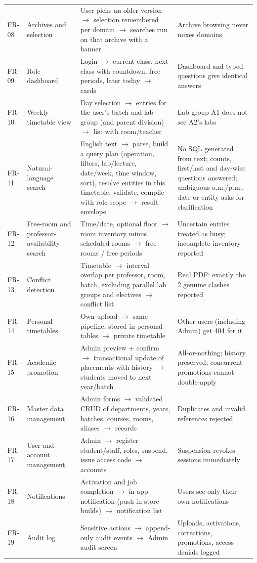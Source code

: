 \begin{longtable}{@{}p{1.1cm}p{3.4cm}p{6.2cm}p{4.9cm}@{}}
FR-08 & Archives and selection & User picks an older version $\rightarrow$ selection remembered per domain $\rightarrow$ searches run on that archive with a banner & Archive browsing never mixes domains\\
FR-09 & Role dashboard & Login $\rightarrow$ current class, next class with countdown, free periods, later today $\rightarrow$ cards & Dashboard and typed questions give identical answers\\
FR-10 & Weekly timetable view & Day selection $\rightarrow$ entries for the user's batch and lab group (and parent division) $\rightarrow$ list with room/teacher & Lab group A1 does not see A2's labs\\
FR-11 & Natural-language search & English text $\rightarrow$ parse, build a query plan (operation, filters, lab/lecture, date/week, time window, sort), resolve entities in this timetable, validate, compile with role scope $\rightarrow$ result envelope & No SQL generated from text; counts, first/last and day-wise questions answered; ambiguous a.m./p.m., date or entity asks for clarification\\
FR-12 & Free-room and professor-availability search & Time/date, optional floor $\rightarrow$ room inventory minus scheduled rooms $\rightarrow$ free rooms / free periods & Uncertain entries treated as busy; incomplete inventory reported\\
FR-13 & Conflict detection & Timetable $\rightarrow$ interval overlap per professor, room, batch, excluding parallel lab groups and electives $\rightarrow$ conflict list & Real PDF: exactly the 2 genuine clashes reported\\
FR-14 & Personal timetables & Own upload $\rightarrow$ same pipeline, stored in personal tables $\rightarrow$ private timetable & Other users (including Admin) get 404 for it\\
FR-15 & Academic promotion & Admin preview + confirm $\rightarrow$ transactional update of placements with history $\rightarrow$ students moved to next year/batch & All-or-nothing; history preserved; concurrent promotions cannot double-apply\\
FR-16 & Master data management & Admin forms $\rightarrow$ validated CRUD of departments, years, batches, courses, rooms, aliases $\rightarrow$ records & Duplicates and invalid references rejected\\
FR-17 & User and account management & Admin $\rightarrow$ register student/staff, roles, suspend, issue access code $\rightarrow$ accounts & Suspension revokes sessions immediately\\
FR-18 & Notifications & Activation and job completion $\rightarrow$ in-app notification (push in store builds) $\rightarrow$ notification list & Users see only their own notifications\\
FR-19 & Audit log & Sensitive actions $\rightarrow$ append-only audit events $\rightarrow$ Admin audit screen & Uploads, activations, corrections, promotions, access denials logged\\
\bottomrule
\end{longtable}
\endgroup

